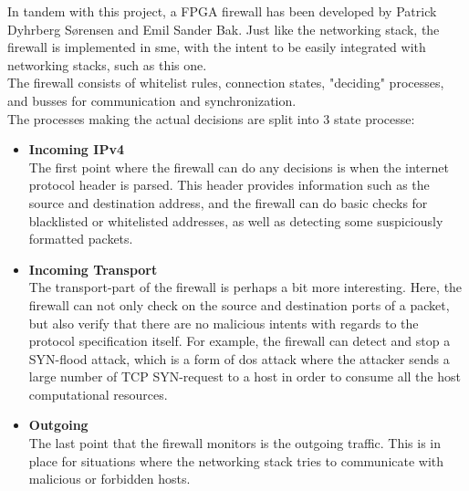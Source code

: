 In tandem with this project, a FPGA firewall has been developed by
Patrick Dyhrberg Sørensen and Emil Sander Bak. Just like the networking stack,
the firewall is implemented in \gls{sme}, with the intent to be easily
integrated with networking stacks, such as this one\cite{fpga_firewall}.\\
The firewall consists of whitelist rules, connection states, "deciding"
processes, and busses for communication and synchronization\cite{fpga_firewall}.\\
The processes making the actual decisions are split into 3 state processe:
\begin{itemize}
\item \textbf{Incoming IPv4}\\
The first point where the firewall can do any decisions is when the internet
protocol header is parsed. This header provides information such as the source
and destination address, and the firewall can do basic checks for blacklisted
or whitelisted addresses, as well as detecting some suspiciously formatted
packets.
\item \textbf{Incoming Transport}\\
The transport-part of the firewall is perhaps a bit more interesting. Here,
the firewall can not only check on the source and destination ports of a packet,
but also verify that there are no malicious intents with regards to the protocol
specification itself. For example, the firewall can detect and stop a SYN-flood
attack, which is a form of \gls{dos attack} where the attacker sends a large
number of TCP SYN-request to a host in order to consume all the host
computational resources.

\item \textbf{Outgoing}\\
The last point that the firewall monitors is the outgoing traffic. This is in
place for situations where the networking stack tries to communicate with
malicious or forbidden hosts.
\end{itemize}

